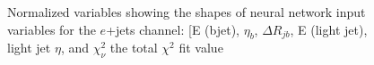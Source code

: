 \begin{figure}[h!]
\vspace{-4.5mm}
\hfil
{}
\caption{Normalized variables showing the shapes of neural network input variables for the $e$+jets channel: [E (bjet), $\eta_b$, $\Delta R_{jb}$, E (light jet), light jet $\eta$, and $\chi^2_\nu$ the total $\chi^2$ fit value  }
\label{fig:VarPlotsej4}
\end{figure}


